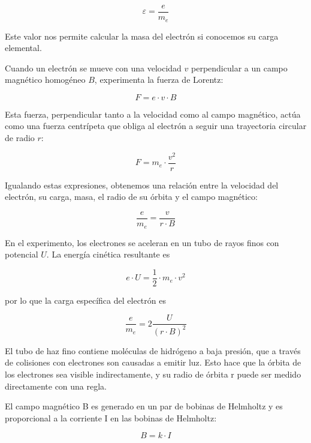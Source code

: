 \documentclass[twocolumn,a4paper,11pt]{scrartcl}
\begin{document}
\begin{equation}
\varepsilon = \frac{e}{m_e}
\end{equation}

Este valor nos permite calcular la masa del electrón si conocemos su carga elemental.

Cuando un electrón se mueve con una velocidad $v$ perpendicular a un campo magnético homogéneo $B$, experimenta la fuerza de Lorentz:

\begin{equation}
F = e \cdot v \cdot B
\end{equation}

Esta fuerza, perpendicular tanto a la velocidad como al campo magnético, actúa como una fuerza centrípeta que obliga al electrón a seguir una trayectoria circular de radio $r$:

\begin{equation}
F = m_e \cdot \frac{v^2}{r}
\end{equation}

Igualando estas expresiones, obtenemos una relación entre la velocidad del electrón, su carga, masa, el radio de su órbita y el campo magnético:

\begin{equation}
\frac{e}{m_e} = \frac{v}{r \cdot B}
\end{equation}

En el experimento, los electrones se aceleran en un tubo de rayos finos con potencial $U$. La energía cinética resultante es

\begin{equation}
    e \cdot U = \frac{1}{2} \cdot m_e \cdot v^2
\end{equation}

por lo que la carga específica del electrón es

\begin{equation}
\frac{e}{m_e} = 2 \frac{U}{(r \cdot B)^2}
\end{equation}

El tubo de haz fino contiene moléculas de hidrógeno a baja presión, que a través de colisiones con electrones son causadas a emitir luz. Esto hace que la órbita de los electrones sea visible indirectamente, y su radio de órbita r puede ser medido directamente con una regla.

El campo magnético B es generado en un par de bobinas de Helmholtz y es proporcional a la corriente I en las bobinas de Helmholtz:

\begin{equation}
B = k \cdot I
\end{equation}
\end{document}
